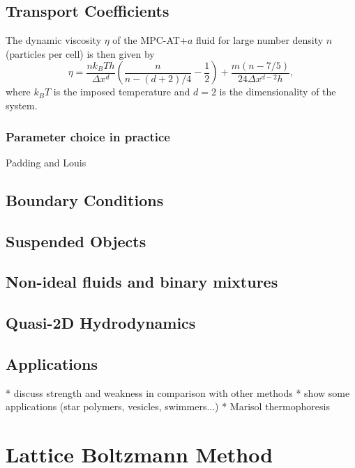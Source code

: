\documentclass[8.5pt,twoside,twocolumn]{article}
\begin{document}
\subsection{Transport Coefficients}

The dynamic viscosity $\eta$ of the MPC-AT+$a$ fluid for large number density $n$ (particles per cell) is then given by
%
\begin{equation}
\eta = \frac{n k_BT h}{\Delta x^d} \left( \frac{n}{n-(d+2)/4}-\frac{1}{2} \right)
+ \frac{m (n-7/5)}{24 \Delta x^{d-2} h} ,
\end{equation}
%
where $k_BT$ is the imposed temperature and $d=2$ is the dimensionality of the system.


\subsubsection{Parameter choice in practice}

Padding and Louis

\subsection{Boundary Conditions}
\subsection{Suspended Objects}
\subsection{Non-ideal fluids and binary mixtures}
\subsection{Quasi-2D Hydrodynamics}
\subsection{Applications}

* discuss strength and weakness in comparison with other methods
* show some applications (star polymers, vesicles, swimmers...)
* Marisol thermophoresis



\section{Lattice Boltzmann Method}
\end{document}
